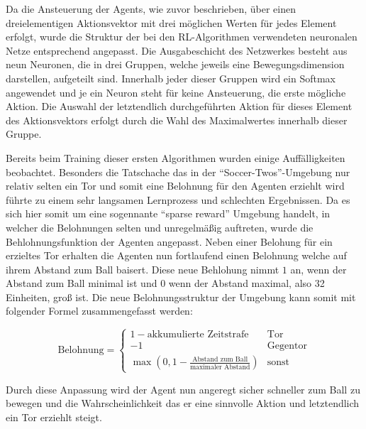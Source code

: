 \documentclass[twocolumn]{webofc}
\begin{document}
Da die Ansteuerung der Agents, wie zuvor beschrieben, über einen dreielementigen Aktionsvektor mit drei möglichen Werten für jedes Element erfolgt, wurde die Struktur der bei den \ac{RL}-Algorithmen verwendeten neuronalen Netze entsprechend angepasst. Die Ausgabeschicht des Netzwerkes besteht aus neun Neuronen, die in drei Gruppen, welche jeweils eine Bewegungsdimension darstellen, aufgeteilt sind. Innerhalb jeder dieser Gruppen wird ein Softmax angewendet und je ein Neuron steht für keine Ansteuerung, die erste mögliche Aktion. Die Auswahl der letztendlich durchgeführten Aktion für dieses Element des Aktionsvektors erfolgt durch die Wahl des Maximalwertes innerhalb dieser Gruppe.


Bereits beim Training dieser ersten Algorithmen wurden einige Auffälligkeiten beobachtet. Besonders die Tatschache das in der \enquote{Soccer-Twos}-Umgebung nur relativ selten ein Tor und somit eine Belohnung für den Agenten erziehlt wird führte zu einem sehr langsamen Lernprozess und schlechten Ergebnissen. Da es sich hier somit um eine sogennante \enquote{sparse reward} Umgebung handelt, in welcher die Belohnungen selten und unregelmäßig auftreten, wurde die Behlohnungsfunktion der Agenten angepasst. Neben einer Belohung für ein erzieltes Tor erhalten die Agenten nun fortlaufend einen Belohnung welche auf ihrem Abstand zum Ball baisert. Diese neue Behlohung nimmt \(1\) an, wenn der Abstand zum Ball minimal ist und \(0\) wenn der Abstand maximal, also 32 Einheiten, groß ist. Die neue Belohnungsstruktur der Umgebung kann somit mit folgender Formel zusammengefasst werden:


\[
\text{Belohnung} = \begin{cases}
	1 - \text{akkumulierte Zeitstrafe} & \text{Tor} \\
	-1 & \text{Gegentor} \\
	\max\left(0, 1 - \frac{\text{Abstand zum Ball}}{\text{maximaler Abstand}}\right) & \text{sonst}
\end{cases}
\]

Durch diese Anpassung wird der Agent nun angeregt sicher schneller zum Ball zu bewegen und die Wahrscheinlichkeit das er eine sinnvolle Aktion und letztendlich ein Tor erziehlt steigt.
\end{document}
